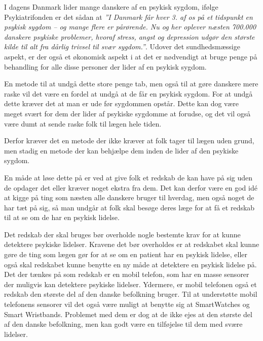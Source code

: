 


I dagens Danmark lider mange danskere af en psykisk sygdom, ifølge Psykiatrifonden er det sådan at \textit{''I Danmark får hver 3. af os på et tidspunkt en psykisk sygdom – og mange flere er pårørende. Nu og her oplever næsten 700.000 danskere psykiske problemer, hvoraf stress, angst og depression udgør den største kilde til alt fra dårlig trivsel til svær sygdom.''}\cite{psykiatrifonden}.
Udover det sundhedsmæssige aspekt, er der også et økonomisk aspekt i at det er nødvendigt at bruge penge på behandling for alle disse personer der lider af en psykisk sygdom.

En metode til at undgå dette store penge tab, men også til at gøre danskere mere raske vil det være en fordel at undgå at de får en psykisk sygdom.
For at undgå dette kræver det at man er ude før sygdommen opstår.
Dette kan dog være meget svært for dem der lider af psykiske sygdomme at forudse, og det vil også være dumt at sende raske folk til lægen hele tiden.

Derfor kræver det en metode der ikke kræver at folk tager til lægen uden grund, men stadig en metode der kan behjælpe dem inden de lider af den psykiske sygdom.

En måde at løse dette på er ved at give folk et redskab de kan have på sig uden de opdager det eller kræver noget ekstra fra dem.
Det kan derfor være en god idé at kigge på ting som næsten alle danskere bruger til hverdag, men også noget de har tæt på sig, så man undgår at folk skal besøge deres læge for at få et redskab til at se om de har en psykisk lidelse.

Det redskab der skal bruges bør overholde nogle bestemte krav for at kunne detektere psykiske lidelser.
Kravene det bør overholdes er at redskabet skal kunne gøre de ting som lægen gør for at se om en patient har en psykisk lidelse, eller også skal redskabet kunne benytte en ny måde at detektere en psykisk lidelse på.
Det der tænkes på som redskab er en mobil telefon, som har en masse sensorer der muligvis kan detektere psykiske lidelser. 
Ydermere, er mobil telefonen også et redskab den største del af den danske befolkning bruger.
Til at understøtte mobil telefonens sensorer vil det også være muligt at benytte sig at SmartWatches og Smart Wristbands.
Problemet med dem er dog at de ikke ejes at den største del af den danske befolkning, men kan godt være en tilføjelse til dem med svære lidelser.

